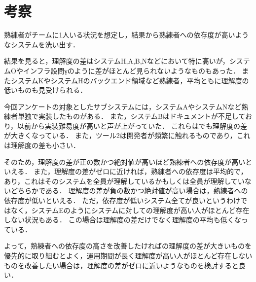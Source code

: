 \section{考察}
熟練者がチームに1人いる状況を想定し，結果から熟練者への依存度が高いようなシステムを洗い出す．

結果を見ると，理解度の差はシステムH,A,B,Nなどにおいて特に高いが，システムOやインフラ設問γのように差がほとんど見られないようなものもあった．
またシステムKやシステムHのバックエンド領域など熟練者，平均ともに理解度の低いものも見受けられる．

今回アンケートの対象としたサブシステムには，システムAやシステムNなど熟練者単独で実装したものがある．
また，システムBはドキュメントが不足しており，以前から実装難易度が高いと声が上がっていた．
これらはでも理解度の差が大きくなっている．
また，ツール2は開発者が頻繁に触れるものであり，これは理解度の差も小さい．

そのため，理解度の差が正の数かつ絶対値が高いほど熟練者への依存度が高いといえる．
また，理解度の差がゼロに近ければ，熟練者への依存度は平均的で，あり，これはそのシステムを全員が理解しているかもしくは全員が理解していないどちらかである．
理解度の差が負の数かつ絶対値が高い場合は，熟練者への依存度が低いといえる．
ただ，依存度が低いシステム全てが良いというわけではなく，システムEのようにシステムに対しての理解度が高い人がほとんど存在しない状況もある．
この場合は理解度の差だけでなく理解度の平均も低くなっている．

よって，熟練者への依存度の高さを改善したければの理解度の差が大きいものを優先的に取り組むとよく，運用期間が長く理解度が高い人がほとんど存在しないものを改善したい場合は，理解度の差がゼロに近いようなものを検討すると良い．
